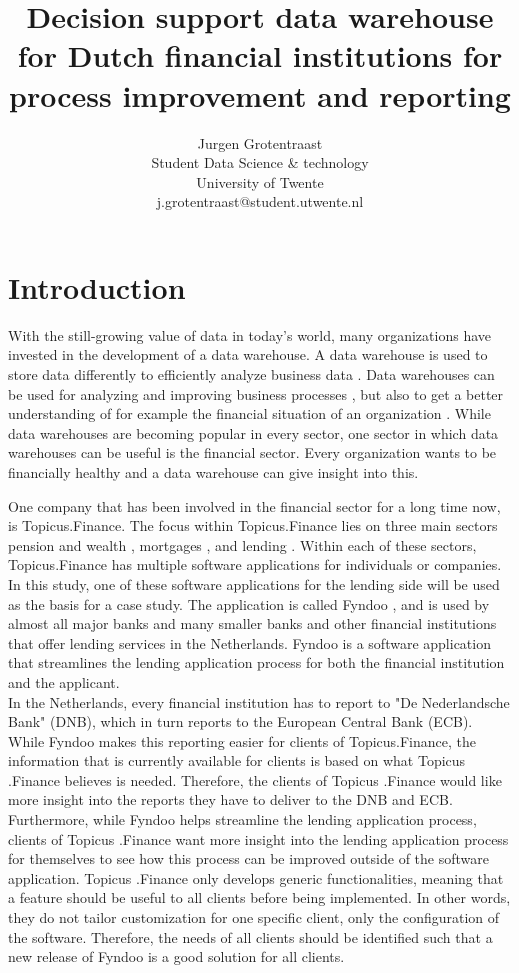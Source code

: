\documentclass[11pt]{article}
\title{Decision support data warehouse for Dutch financial institutions for
process improvement and reporting}
\author{Jurgen Grotentraast \\
  Student Data Science \& technology\\
  University of Twente \\
  j.grotentraast@student.utwente.nl\\}
\begin{document}
{\makeatletter\acl@finalcopytrue
  \maketitle
}

\section{Introduction}
With the still-growing value of data in today's world, many organizations have invested in the development of a data warehouse. A data warehouse is used to store data differently to efficiently analyze business data \cite{gupta1997selection}. Data warehouses can be used for analyzing and improving business processes \cite{shahzad2009goal}, but also to get a better understanding of for example the financial situation of an organization \cite{lapura2018development}. While data warehouses are becoming popular in every sector, one sector in which data warehouses can be useful is the financial sector. Every organization wants to be financially healthy and a data warehouse can give insight into this.

One company that has been involved in the financial sector for a long time now, is Topicus.Finance. The focus within Topicus.Finance lies on three main sectors pension and wealth \cite{pension},  mortgages \cite{mortgages}, and lending \cite{businesslending}. Within each of these sectors, Topicus.Finance has multiple software applications for individuals or companies. In this study, one of these software applications for the lending side will be used as the basis for a case study. The application is called Fyndoo \cite{fyndoo}, and is used by almost all major banks and many smaller banks and other financial institutions that offer lending services in the Netherlands. Fyndoo is a software application that streamlines the lending application process for both the financial institution and the applicant. \\

In the Netherlands, every financial institution has to report to "De Nederlandsche Bank" (DNB), which in turn reports to the European Central Bank (ECB). While Fyndoo makes this reporting easier for clients of Topicus.Finance, the information that is currently available for clients is based on what Topicus .Finance believes is needed. Therefore, the clients of Topicus .Finance would like more insight into the reports they have to deliver to the DNB and ECB. Furthermore, while Fyndoo helps streamline the lending application process, clients of Topicus .Finance want more insight into the lending application process for themselves to see how this process can be improved outside of the software application. Topicus .Finance only develops generic functionalities, meaning that a feature should be useful to all clients before being implemented. In other words, they do not tailor customization for one specific client, only the configuration of the software. Therefore, the needs of all clients should be identified such that a new release of Fyndoo is a good solution for all clients. \\
\end{document}
